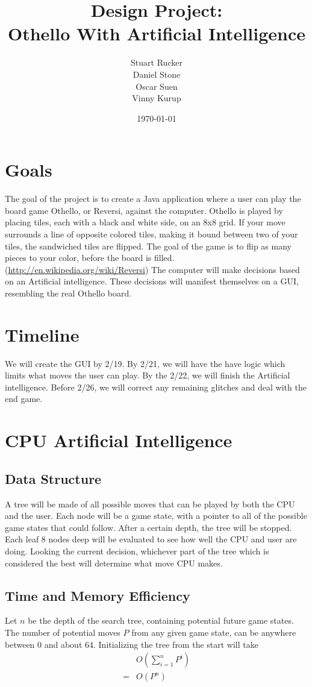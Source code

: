 \documentclass[12pt]{article}
\title{Design Project: \\ Othello With Artificial Intelligence}
\author{Stuart Rucker \\ Daniel Stone \\ Oscar Suen\\ Vinny Kurup}
\date{\today}
\begin{document}
\maketitle

\section{Goals}
The goal of the project is to create a Java application where a user can play the board game Othello, or Reversi, against the computer. Othello is played by placing tiles, each with a black and white side,  on an 8x8 grid. If your move surrounds a line of opposite colored tiles, making it bound between two of your tiles, the sandwiched tiles are flipped. The goal of the game is to flip as many pieces to your color, before the board is filled. (\url{http://en.wikipedia.org/wiki/Reversi}) The computer will make decisions based on an Artificial intelligence. These decisions will manifest themselves on a GUI, resembling the real Othello board.

\section{Timeline}
We will create the GUI by 2/19. By 2/21, we will have the have logic which limits what moves the user can play. By the 2/22, we will finish the Artificial intelligence. Before  2/26, we will correct any remaining glitches and deal with the end game.

\section{CPU Artificial Intelligence}
\subsection{Data Structure}
A tree will be made of all possible moves that can be played by both the CPU and the user. Each node will be a game state, with a pointer to all of the possible game states that could follow. After a certain depth, the tree will be stopped. Each leaf 8 nodes deep will be evaluated to see how well the CPU and user are doing. Looking the current decision, whichever part of the tree which is considered the best will determine what move CPU makes.
\subsection{Time and Memory Efficiency}
Let $n$ be the depth of the search tree, containing potential future game states. The number of potential moves $P$ from any given game state, can be anywhere between 0 and about 64. Initializing the tree from the start will take
\begin{align*}
&O(\sum_{i=1}^{n}P^i) \\
= &O(P^n) \\
\end{align*}
\end{document}

